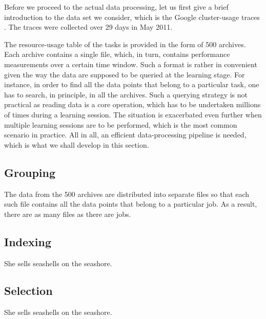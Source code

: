 Before we proceed to the actual data processing, let us first give a brief
introduction to the data set we consider, which is the Google cluster-usage
traces \cite{reiss2011}. The traces were collected over 29 days in May 2011.

The resource-usage table of the tasks is provided in the form of 500 archives.
Each archive contains a single  file, which, in turn, contains
performance measurements over a certain time window. Such a format is rather in
convenient given the way the data are supposed to be queried at the learning
stage. For instance, in order to find all the data points that belong to a
particular task, one has to search, in principle, in all the archives. Such a
querying strategy is not practical as reading data is a core operation, which
has to be undertaken millions of times during a learning session. The situation
is exacerbated even further when multiple learning sessions are to be performed,
which is the most common scenario in practice. All in all, an efficient
data-processing pipeline is needed, which is what we shall develop in this
section.

\subsection{Grouping}
The  data from the 500 archives are distributed into separate 
files so that each such file contains all the data points that belong to a
particular job. As a result, there are as many  files as there are jobs.

\subsection{Indexing}
She sells seashells on the seashore.

\subsection{Selection}
She sells seashells on the seashore.
